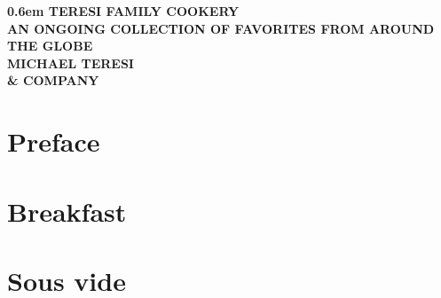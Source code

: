 \documentclass{family_cookbook}
\begin{document}
\frontmatter
\begin{titlepage}
\onecolumn
\pagestyle{empty}
\newcommand\nbvspace[1][3]{\vspace*{\stretch{#1}}}
\newcommand\nbstretchyspace{\spaceskip0.5em plus 0.25em minus 0.25em}
\newcommand{\nbtitlestretch}{\spaceskip0.6em}
{
	\centering
	\bfseries
	\nbvspace[1]
	\Huge
	{\nbtitlestretch
		TERESI FAMILY COOKERY
	}\\
	\nbvspace[1]
	\footnotesize
	AN ONGOING COLLECTION OF FAVORITES FROM AROUND THE GLOBE\\
	\nbvspace[1]
	\Large MICHAEL TERESI \\ \small \& COMPANY\\
	\nbvspace[1]
	\hspace{1em}  %
	\vfill
}
\end{titlepage}

\dominitoc  %
\nomtcrule  %


\tableofcontents


\chapter*{Preface}
\enlargethispage{5\baselineskip}  %


\clearpage


\mainmatter


\setcounter{mtc}{0}  %
\mtcaddchapter       %
\chapter{Breakfast}
\minitoc
\clearpage





\chapter{Sous vide}
\minitoc
\clearpage



\end{document}
